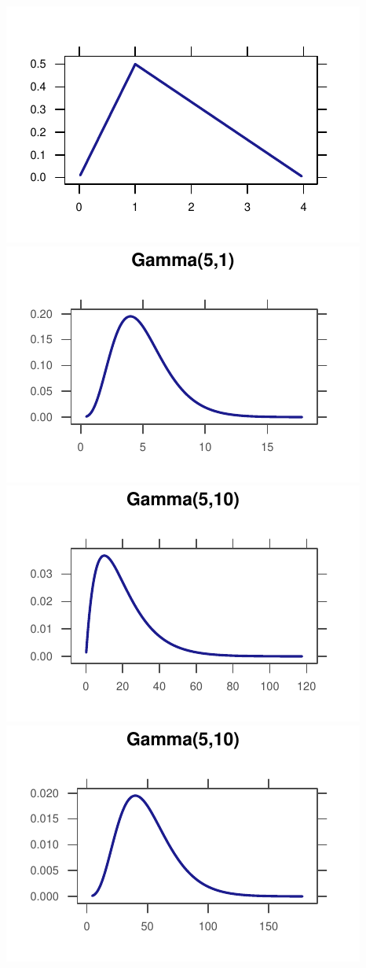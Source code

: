 \documentclass[twoside]{book}\usepackage[]{graphicx}\usepackage[]{xcolor}
\makeatletter
\def\maxwidth{ %
  \ifdim\Gin@nat@width>\linewidth
    \linewidth
  \else
    \Gin@nat@width
  \fi
}
\newenvironment{knitrout}{}{} %
\makeatother
\begin{document}
\begin{knitrout}
{\centering \includegraphics[width=\maxwidth]{figures/fig-unnamed-chunk-72-1} 
\includegraphics[width=\maxwidth]{figures/fig-unnamed-chunk-72-2} 
\includegraphics[width=\maxwidth]{figures/fig-unnamed-chunk-72-3} 
\includegraphics[width=\maxwidth]{figures/fig-unnamed-chunk-72-4} 

}
\end{knitrout}
\end{document}
